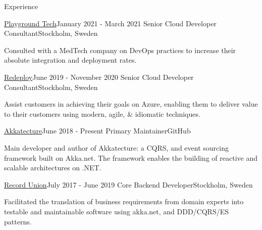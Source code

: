 \documentclass{resume} %
\begin{document}
    \begin{rSection}{Experience}

        \begin{rSubsection}
            {\href{https://www.playgroundcloud.se/}{Playground Tech}}{January 2021 - March 2021}
            {Senior Cloud Developer Consultant}{Stockholm, Sweden}
            
            \item Consulted with a MedTech company on  DevOps practices to increase their absolute integration and deployment rates.
                
        \end{rSubsection}

        \begin{rSubsection}
            {\href{https://redeploy.com}{Redeploy}}{June 2019 - November 2020}
            {Senior Cloud Developer Consultant}{Stockholm, Sweden}
            
            \item Assist customers in achieving their goals on Azure, enabling them to deliver
                value to their customers using modern, agile, \& idiomatic techniques.
                
        \end{rSubsection}

        \begin{rSubsection}
            {\href{https://akkatecture.net}{Akkatecture}}{June 2018 - Present}
            {Primary Maintainer}{GitHub}
            
            \item Main developer and author of Akkatecture: a CQRS, and event sourcing
                framework built on Akka.net. The framework enables the
                building of reactive and scalable architectures on .NET.
                
        \end{rSubsection}

        \begin{rSubsection}
            {\href{https://recordunion.com}{Record Union}}{July 2017 - June 2019}
            {Core Backend Developer}{Stockholm, Sweden}
            
            \item Facilitated the translation of business requirements from domain
                experts into testable and maintainable software using akka.net,
                and DDD/CQRS/ES patterns.
                

\end{rSubsection}
\end{rSection}
\end{document}
